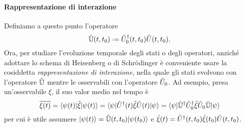 \paragraph{Rappresentazione di interazione}
Definiamo a questo punto l'operatore
\begin{equation}
	\op{\mathbb U}(t,t_0)\defeq\adj{\op U_0}(t,t_0)\op U(t,t_0).
\end{equation}
Ora, per studiare l'evoluzione temporale degli stati o degli operatori, anzich\'e adottare lo schema di Heisenberg o di Schr\"odinger è conveniente usare la cosiddetta \emph{rappresentazione di interazione}, nella quale gli stati evolvono con l'operatore $\hat{\mathbb U}$ mentre le osservabili con l'operatore $\hat{U}_0$.
Ad esempio, presa un'osservabile $\xi$, il suo valor medio nel tempo è
\begin{equation}
	\overline{\xi(t)}=
	\langle\psi(t)\rvert\hat{\xi}\lvert\psi(t)\rangle=
	\langle\psi\rvert\hat{U}^\dagger(t)\hat{\xi}\hat{U}(t)\lvert\psi\rangle=
	\langle\psi\rvert\hat{\mathbb U}^\dagger\hat{U}_0^\dagger\hat{\xi}\hat{U}_0\hat{\mathbb U}\lvert\psi\rangle
	\label{eq:esempio-rappresentazione-interazione}
\end{equation}
per cui è utile assumere $\lvert\psi(t)\rangle=\hat{\mathbb U}(t,t_0)\lvert\psi(t_0)\rangle$ e $\hat{\xi}(t)=\hat{U}^\dagger(t,t_0)\hat{\xi}(t_0)\hat{U}(t,t_0)$.


